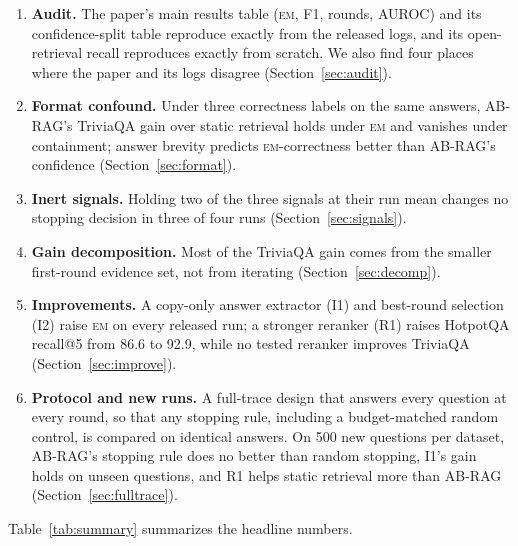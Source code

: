 \documentclass[11pt]{article}
\newcommand{\EM}{\textsc{em}}
\begin{document}
\begin{enumerate}
\item \textbf{Audit.} The paper's main results table (\EM{}, F1, rounds, AUROC) and its confidence-split table reproduce exactly from the released logs, and its open-retrieval recall reproduces exactly from scratch. We also find four places where the paper and its logs disagree (Section~\ref{sec:audit}).
\item \textbf{Format confound.} Under three correctness labels on the same answers, AB-RAG's TriviaQA gain over static retrieval holds under \EM{} and vanishes under containment; answer brevity predicts \EM{}-correctness better than AB-RAG's confidence (Section~\ref{sec:format}).
\item \textbf{Inert signals.} Holding two of the three signals at their run mean changes no stopping decision in three of four runs (Section~\ref{sec:signals}).
\item \textbf{Gain decomposition.} Most of the TriviaQA gain comes from the smaller first-round evidence set, not from iterating (Section~\ref{sec:decomp}).
\item \textbf{Improvements.} A copy-only answer extractor (I1) and best-round selection (I2) raise \EM{} on every released run; a stronger reranker (R1) raises HotpotQA recall@5 from 86.6 to 92.9, while no tested reranker improves TriviaQA (Section~\ref{sec:improve}).
\item \textbf{Protocol and new runs.} A full-trace design that answers every question at every round, so that any stopping rule, including a budget-matched random control, is compared on identical answers. On 500 new questions per dataset, AB-RAG's stopping rule does no better than random stopping, I1's gain holds on unseen questions, and R1 helps static retrieval more than AB-RAG (Section~\ref{sec:fulltrace}).
\end{enumerate}

Table~\ref{tab:summary} summarizes the headline numbers.
\end{document}
